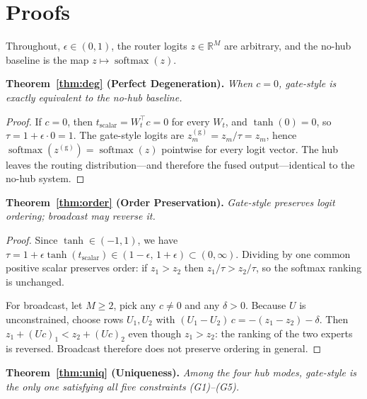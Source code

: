\documentclass[10pt,twoside]{article}
\newcommand{\softmax}{\operatorname{softmax}}
\newcommand{\R}{\mathbb{R}}
\theoremstyle{definition}
\theoremstyle{plain}
\theoremstyle{remark}
\begin{document}
\section{Proofs}
\label{app:proofs}

Throughout, $\epsilon \in (0,1)$, the router logits $z \in \R^M$ are arbitrary, and the no-hub baseline is the map $z \mapsto \softmax(z)$.

\medskip
\noindent\textbf{Theorem~\ref{thm:deg} (Perfect Degeneration).} \emph{When $c = 0$, gate-style is exactly equivalent to the no-hub baseline.}

\begin{proof}
If $c = 0$, then $t_{\text{scalar}} = W_t^\top c = 0$ for every $W_t$, and $\tanh(0) = 0$, so $\tau = 1 + \epsilon \cdot 0 = 1$. The gate-style logits are $z^{(\text{g})}_m = z_m / \tau = z_m$, hence $\softmax(z^{(\text{g})}) = \softmax(z)$ pointwise for every logit vector. The hub leaves the routing distribution---and therefore the fused output---identical to the no-hub system.
\end{proof}

\medskip
\noindent\textbf{Theorem~\ref{thm:order} (Order Preservation).} \emph{Gate-style preserves logit ordering; broadcast may reverse it.}

\begin{proof}
Since $\tanh \in (-1, 1)$, we have $\tau = 1 + \epsilon \tanh(t_{\text{scalar}}) \in (1 - \epsilon,\, 1 + \epsilon) \subset (0, \infty)$. Dividing by one common positive scalar preserves order: if $z_1 > z_2$ then $z_1 / \tau > z_2 / \tau$, so the softmax ranking is unchanged.

For broadcast, let $M \geq 2$, pick any $c \neq 0$ and any $\delta > 0$. Because $U$ is unconstrained, choose rows $U_1, U_2$ with $(U_1 - U_2)\,c = -(z_1 - z_2) - \delta$. Then $z_1 + (Uc)_1 < z_2 + (Uc)_2$ even though $z_1 > z_2$: the ranking of the two experts is reversed. Broadcast therefore does not preserve ordering in general.
\end{proof}

\medskip
\noindent\textbf{Theorem~\ref{thm:uniq} (Uniqueness).} \emph{Among the four hub modes, gate-style is the only one satisfying all five constraints (G1)--(G5).}
\end{document}
